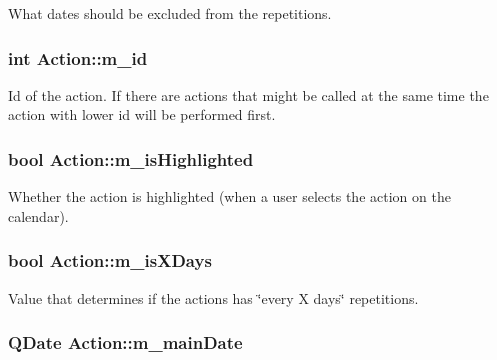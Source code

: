 What dates should be excluded from the repetitions. 

\hypertarget{class_action_a0f56dba599957c8a66d808c525cbd243}{
\subsubsection[{m\-\_\-id}]{\setlength{\rightskip}{0pt plus 5cm}int Action\-::m\-\_\-id\hspace{0.3cm}{\ttfamily [private]}}}\label{class_action_a0f56dba599957c8a66d808c525cbd243}


Id of the action. If there are actions that might be called at the same time the action with lower id will be performed first. 

\hypertarget{class_action_aada07b527d172c811c85cd1d0e0de876}{
\subsubsection[{m\-\_\-is\-Highlighted}]{\setlength{\rightskip}{0pt plus 5cm}bool Action\-::m\-\_\-is\-Highlighted\hspace{0.3cm}{\ttfamily [private]}}}\label{class_action_aada07b527d172c811c85cd1d0e0de876}


Whether the action is highlighted (when a user selects the action on the calendar). 

\hypertarget{class_action_a153c3f547daf43271aee2868cadb0762}{
\subsubsection[{m\-\_\-is\-X\-Days}]{\setlength{\rightskip}{0pt plus 5cm}bool Action\-::m\-\_\-is\-X\-Days\hspace{0.3cm}{\ttfamily [private]}}}\label{class_action_a153c3f547daf43271aee2868cadb0762}


Value that determines if the actions has \char`\"{}every X days\char`\"{} repetitions. 

\hypertarget{class_action_abb545fb5aae40e818ae95b44d56d7478}{
\subsubsection[{m\-\_\-main\-Date}]{\setlength{\rightskip}{0pt plus 5cm}Q\-Date Action\-::m\-\_\-main\-Date\hspace{0.3cm}{\ttfamily [private]}}}\label{class_action_abb545fb5aae40e818ae95b44d56d7478}


